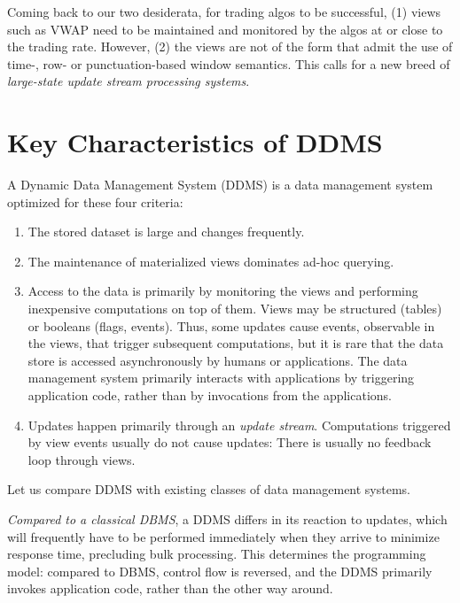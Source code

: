 Coming back to our two desiderata,
for trading algos to be successful, (1) views such as VWAP need to be maintained and monitored by the algos at or close to the trading rate. However, (2) the views are not of the form that admit the use of time-, row- or punctuation-based
window semantics. This calls for a new breed of {\em large-state update stream processing systems}.



\section{Key Characteristics of DDMS}


A Dynamic Data Management System (DDMS) is a
data management system optimized for these four criteria:\begin{enumerate}
\item
The stored dataset is large and changes frequently.

\item 
The
maintenance of materialized views dominates ad-hoc querying.

\item
Access to the data is primarily by monitoring the views and performing inexpensive computations on top of them.
%
%
Views may be structured (tables) or booleans (flags, events). Thus, some updates cause events, observable in the views, that trigger subsequent computations, but it is rare that the data store is accessed asynchronously by humans or applications. The data management system primarily interacts with applications by triggering application code, rather than by invocations from the applications.

\item
Updates happen primarily through an {\em update stream}\/. Computations triggered by view events usually do not cause updates: There is usually no feedback loop through views.
\end{enumerate}




Let us compare DDMS with existing classes of data management systems.

{\em Compared to a classical DBMS}\/, a DDMS differs in its reaction to updates, which will frequently have to be performed immediately when they arrive to minimize response time, precluding bulk processing. This determines the programming model: compared to DBMS, control flow is reversed, and the DDMS primarily invokes application code, rather than the other way around.

